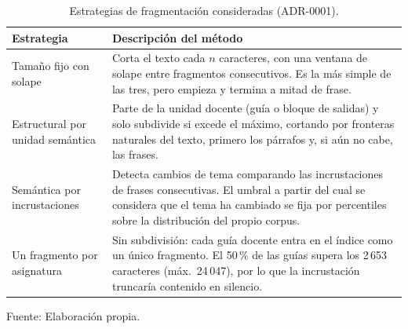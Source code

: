 \begin{table}[htbp]
  \centering
  \small
  \caption{Estrategias de fragmentación consideradas (ADR-0001).}
  \label{tab:alternativas_chunking}
  \begin{tabularx}{\textwidth}{@{}>{\raggedright\arraybackslash}p{3.2cm} X@{}}
    \toprule
    \textbf{Estrategia}              & \textbf{Descripción del método} \\
    \midrule
    Tamaño fijo con solape           &
    Corta el texto cada $n$ caracteres, con una ventana de solape entre fragmentos consecutivos. Es la más simple de las tres, pero empieza y termina a mitad de frase. \\
    \addlinespace
    Estructural por unidad semántica &
    Parte de la unidad docente (guía o bloque de salidas) y solo subdivide si excede el máximo, cortando por fronteras naturales del texto, primero los párrafos y, si aún no cabe, las frases. \\
    \addlinespace
    Semántica por incrustaciones     &
    Detecta cambios de tema comparando las incrustaciones de frases consecutivas. El umbral a partir del cual se considera que el tema ha cambiado se fija por percentiles sobre la distribución del propio corpus. \\
    \addlinespace
    Un fragmento por asignatura      &
    Sin subdivisión: cada guía docente entra en el índice como un único fragmento. El 50\,\% de las guías supera los 2\,653 caracteres (máx.\ 24\,047), por lo que la incrustación truncaría contenido en silencio. \\
    \bottomrule
  \end{tabularx}
  \begin{minipage}{0.95\textwidth}
    \vspace{4pt}
    \tiny
    Fuente: Elaboración propia.
  \end{minipage}
\end{table}
